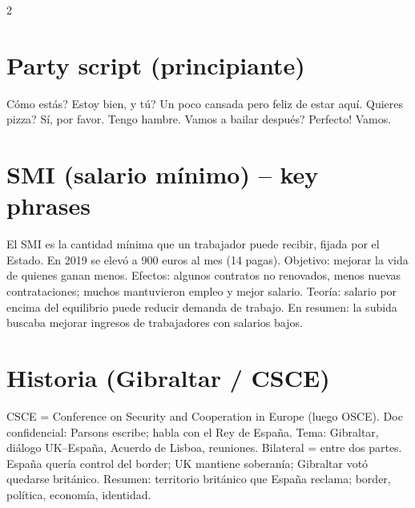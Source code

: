 \documentclass[10pt,landscape,a4paper]{article}
\begin{document}
\begin{multicols}{2}
\section*{\color{accent}Party script (principiante)}
\textquestiondown C\'omo est\'as? Estoy bien, \textquestiondown y t\'u? Un poco cansada pero feliz de estar aqu\'i. \textquestiondown Quieres pizza? S\'i, por favor. Tengo hambre. \textquestiondown Vamos a bailar despu\'es? \textquestiondown Perfecto! Vamos.

\section*{\color{accent}SMI (salario m\'inimo) -- key phrases}
El SMI es la cantidad m\'inima que un trabajador puede recibir, fijada por el Estado. En 2019 se elev\'o a 900 euros al mes (14 pagas). Objetivo: mejorar la vida de quienes ganan menos. Efectos: algunos contratos no renovados, menos nuevas contrataciones; muchos mantuvieron empleo y mejor salario. Teor\'ia: salario por encima del equilibrio puede reducir demanda de trabajo. En resumen: la subida buscaba mejorar ingresos de trabajadores con salarios bajos.

\section*{\color{accent}Historia (Gibraltar / CSCE)}
CSCE = Conference on Security and Cooperation in Europe (luego OSCE). Doc confidencial: Parsons escribe; habla con el Rey de Espa\~na. Tema: Gibraltar, di\'alogo UK--Espa\~na, Acuerdo de Lisboa, reuniones. Bilateral = entre dos partes. Espa\~na quer\'ia control del border; UK mantiene soberan\'ia; Gibraltar vot\'o quedarse brit\'anico. Resumen: territorio brit\'anico que Espa\~na reclama; border, pol\'itica, econom\'ia, identidad.

\end{multicols}
\vfill
\normalsize
\end{document}
